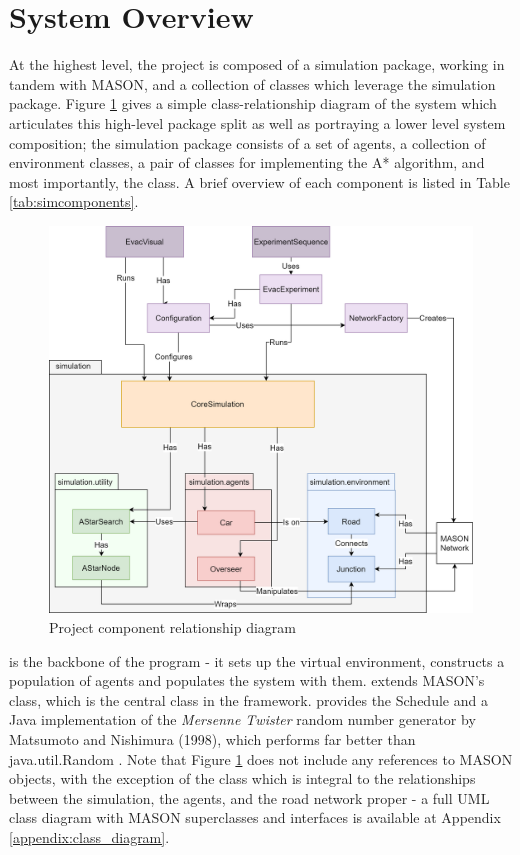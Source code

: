 \section{System Overview}

At the highest level, the project is composed of a simulation package, working in tandem with MASON, and a collection of classes which leverage the simulation package. Figure \ref{fig:system_overview} gives a simple class-relationship diagram of the system which articulates this high-level package split as well as portraying a lower level system composition; the simulation package consists of a set of agents, a collection of environment classes, a pair of classes for implementing the A* algorithm, and most importantly, the  class. A brief overview of each component is listed in Table \ref{tab:simcomponents}.

\begin{figure}[]
    \centering
    \includegraphics[width=0.95\linewidth]{images/system_overview.png}
    \caption{Project component relationship diagram}
    \label{fig:system_overview}
\end{figure}

 is the backbone of the program - it sets up the virtual environment, constructs a population of agents and populates the system with them.  extends MASON's  class, which is the central class in the framework.  provides the Schedule and a Java implementation of the \textit{Mersenne Twister} random number generator by Matsumoto and Nishimura (1998), which performs far better than java.util.Random \cite{Matsumoto1998MersenneGenerator,TylerSunRandomness}. Note that Figure \ref{fig:system_overview} does not include any references to MASON objects, with the exception of the  class which is integral to the relationships between the simulation, the agents, and the road network proper - a full UML class diagram with MASON superclasses and interfaces is available at Appendix \ref{appendix:class_diagram}.

